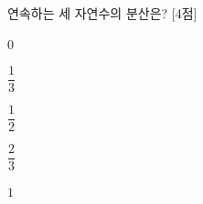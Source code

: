 연속하는 세 자연수의 분산은? \mbox{[4점]}
\begin{choices32}{\rule[-3ex]{0pt}{8ex}$0$}{\rule[-3ex]{0pt}{8ex}$\dfrac{1}{3}$}{\rule[-3ex]{0pt}{8ex}$\dfrac{1}{2}$}{\rule[-3ex]{0pt}{8ex}$\dfrac{2}{3}$}{\rule[-3ex]{0pt}{8ex}$1$}\end{choices32}
